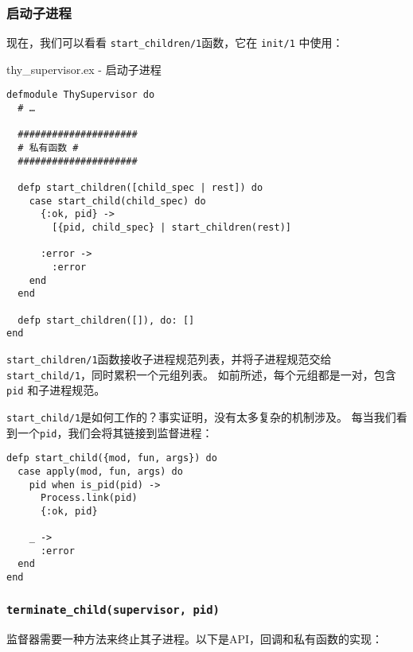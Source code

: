 \subsubsection{启动子进程}

现在，我们可以看看 \texttt{start\_children/1}函数，它在 \texttt{init/1} 中使用：

\begin{code}{thy\_supervisor.ex - 启动子进程}
\begin{verbatim}
defmodule ThySupervisor do
  # …

  #####################
  # 私有函数 #
  #####################

  defp start_children([child_spec | rest]) do
    case start_child(child_spec) do
      {:ok, pid} ->
        [{pid, child_spec} | start_children(rest)]

      :error ->
        :error
    end
  end

  defp start_children([]), do: []
end
\end{verbatim}
\label{lst:start_child}
\end{code}

\texttt{start\_children/1}函数接收子进程规范列表，并将子进程规范交给\texttt{start\_child/1}，同时累积一个元组列表。
如前所述，每个元组都是一对，包含\texttt{pid} 和子进程规范。

\texttt{start\_child/1}是如何工作的？事实证明，没有太多复杂的机制涉及。
每当我们看到一个\texttt{pid}，我们会将其链接到监督进程：

\begin{code}{}
\begin{verbatim}
defp start_child({mod, fun, args}) do
  case apply(mod, fun, args) do
    pid when is_pid(pid) ->
      Process.link(pid)
      {:ok, pid}

    _ ->
      :error
  end
end
\end{verbatim}
\end{code}

\subsubsection{\texttt{terminate\_child(supervisor, pid)}}

监督器需要一种方法来终止其子进程。以下是API，回调和私有函数的实现：


